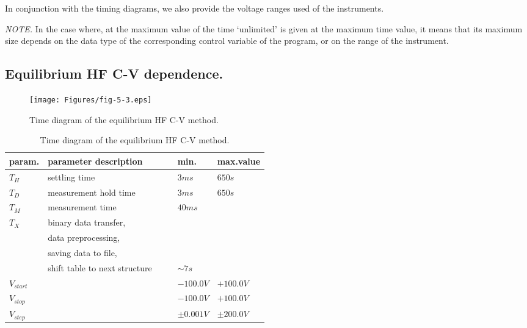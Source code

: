 In conjunction with the timing diagrams, we also provide the voltage
ranges used of the instruments.

\par\emph{NOTE.} In the case where, at the maximum value of the time
`unlimited' is given at the maximum time value, it means that its
maximum size depends on the data type of the corresponding control
variable of the program, or on the range of the instrument.

\newpage
\subsection{Equilibrium HF C-V dependence.}\label{sec:5.4.1}

\begin{figure}[h!]\centering
  \texttt{[image: Figures/fig-5-3.eps]}
  \caption[Time diagram of equilibrium HF C-V method]{Time diagram of
    the equilibrium HF C-V method.}\label{fig:5.3}
\end{figure}

\begin{table}[h!]\centering
  \begin{tabular}{l p{0.5\linewidth} l l}
    param.      & parameter description & min. & max.value\\
    \hline%
    $T_H$       & settling time \dotfill & $3 ms$ & $650 s$\\
    $T_D$       & measurement hold time \dotfill & $3 ms$ & $650 s$\\
    $T_M$       & measurement time \dotfill & $40 ms$\\
    $T_X$       & binary data transfer,\\
                & data preprocessing,\\
                & saving data to file,\\
                & shift table to next structure \dotfill & $\sim 7 s$\\
    $V_{start}$ & \dotfill & $-100.0 V$ & $+100.0 V$\\
    $V_{stop}$  & \dotfill & $-100.0 V$ & $+100.0 V$\\
    $V_{step}$  & \dotfill & $\pm 0.001 V$ & $\pm 200.0 V$\\
    \hline
  \end{tabular}
  \caption[Time diagram of equilibrium HF C-V method]{Time diagram of
    the equilibrium HF C-V method.}\label{tab:5.1}
\end{table}

\newpage
